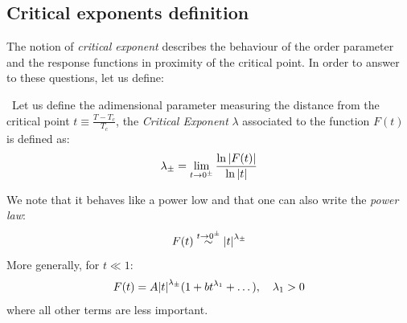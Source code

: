 \documentclass[../main/main.tex]{subfiles}
\begin{document}
\subsection{Critical exponents definition}

The notion of \emph{critical exponent} describes the behaviour of the order parameter and the response functions in proximity of the critical point.
In order to answer to these questions, let us define:

\begin{bluebox}
\begin{definition} \
Let us define the adimensional parameter measuring the distance from the critical point \( t \equiv \frac{T-T_c}{T_c} \), the \emph{Critical Exponent} \( \lambda  \) associated to the function \( F(t) \) is defined as:
\begin{equation}
  \lambda _{\pm} = \lim_{t \rightarrow 0^{\pm}} \frac{\ln{\abs{F(t)} } }{\ln{\abs{t} } }
\end{equation}
\end{definition}
\end{bluebox}
We note that it behaves like a power low and that one can also write the \textit{power law}:
\begin{equation}
  F(t) \overset{t \rightarrow  0^{\pm}}{\sim } \abs{t}^{\lambda _{\pm}}
\end{equation}
More generally, for \( t \ll 1 \):
\begin{equation}
  F(t) = A \abs{t}^{\lambda _{\pm}} ( 1 + bt^{\lambda _1}+ \dots), \quad \lambda _1 > 0
\end{equation}
where all other terms are less important.
\end{document}
